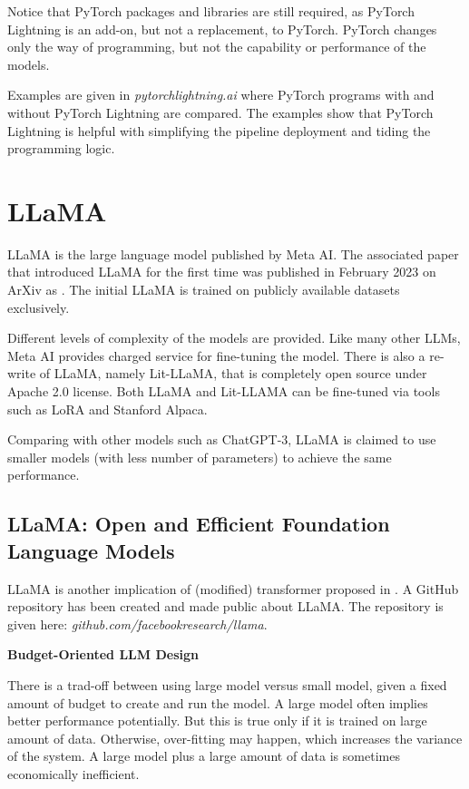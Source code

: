 Notice that PyTorch packages and libraries are still required, as PyTorch Lightning is an add-on, but not a replacement, to PyTorch. PyTorch changes only the way of programming, but not the capability or performance of the models.

Examples are given in \textit{pytorchlightning.ai} where PyTorch programs with and without PyTorch Lightning are compared. The examples show that PyTorch Lightning is helpful with simplifying the pipeline deployment and tiding the programming logic.

\section{LLaMA}

LLaMA is the large language model published by Meta AI. The associated paper that introduced LLaMA for the first time was published in February 2023 on ArXiv as \cite{touvron2023llama}. The initial LLaMA is trained on publicly available
datasets exclusively.

Different levels of complexity of the models are provided. Like many other LLMs, Meta AI provides charged service for fine-tuning the model. There is also a re-write of LLaMA, namely Lit-LLaMA, that is completely open source under Apache 2.0 license. Both LLaMA and Lit-LLAMA can be fine-tuned via tools such as LoRA and Stanford Alpaca.

Comparing with other models such as ChatGPT-3, LLaMA is claimed to use smaller models (with less number of parameters) to achieve the same performance.

\subsection{LLaMA: Open and Efficient Foundation Language Models}

LLaMA is another implication of (modified) transformer proposed in \cite{vaswani2017attention}. A GitHub repository has been created and made public about LLaMA. The repository is given here: \textit{github.com/facebookresearch/llama}.

\vspace{0.1in}
\noindent \textbf{Budget-Oriented LLM Design}
\vspace{0.1in}

There is a trad-off between using large model versus small model, given a fixed amount of budget to create and run the model. A large model often implies better performance potentially. But this is true only if it is trained on large amount of data. Otherwise, over-fitting may happen, which increases the variance of the system. A large model plus a large amount of data is sometimes economically inefficient.

